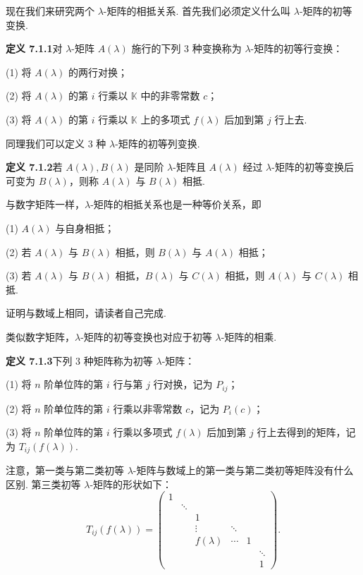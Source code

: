 \documentclass[UTF8,12pt,a4paper,fontset=fandol]{ctexart}
\begin{document}
现在我们来研究两个 $\lambda$-矩阵的相抵关系. 首先我们必须定义什么叫 $\lambda$-矩阵的初等变换.

\noindent\textbf{定义 7.1.1}\quad 对 $\lambda$-矩阵 $A(\lambda)$ 施行的下列 3 种变换称为 $\lambda$-矩阵的初等行变换：

(1) 将 $A(\lambda)$ 的两行对换；

(2) 将 $A(\lambda)$ 的第 $i$ 行乘以 $\mathbb{K}$ 中的非零常数 $c$；

(3) 将 $A(\lambda)$ 的第 $i$ 行乘以 $\mathbb{K}$ 上的多项式 $f(\lambda)$ 后加到第 $j$ 行上去.

同理我们可以定义 3 种 $\lambda$-矩阵的初等列变换.

\noindent\textbf{定义 7.1.2}\quad 若 $A(\lambda),B(\lambda)$ 是同阶 $\lambda$-矩阵且 $A(\lambda)$ 经过 $\lambda$-矩阵的初等变换后可变为 $B(\lambda)$，则称 $A(\lambda)$ 与 $B(\lambda)$ 相抵.

与数字矩阵一样，$\lambda$-矩阵的相抵关系也是一种等价关系，即

(1) $A(\lambda)$ 与自身相抵；

(2) 若 $A(\lambda)$ 与 $B(\lambda)$ 相抵，则 $B(\lambda)$ 与 $A(\lambda)$ 相抵；

(3) 若 $A(\lambda)$ 与 $B(\lambda)$ 相抵，$B(\lambda)$ 与 $C(\lambda)$ 相抵，则 $A(\lambda)$ 与 $C(\lambda)$ 相抵.

证明与数域上相同，请读者自己完成.

类似数字矩阵，$\lambda$-矩阵的初等变换也对应于初等 $\lambda$-矩阵的相乘.

\noindent\textbf{定义 7.1.3}\quad 下列 3 种矩阵称为初等 $\lambda$-矩阵：

(1) 将 $n$ 阶单位阵的第 $i$ 行与第 $j$ 行对换，记为 $P_{ij}$；

(2) 将 $n$ 阶单位阵的第 $i$ 行乘以非零常数 $c$，记为 $P_i(c)$；

(3) 将 $n$ 阶单位阵的第 $i$ 行乘以多项式 $f(\lambda)$ 后加到第 $j$ 行上去得到的矩阵，记为 $T_{ij}(f(\lambda))$.

注意，第一类与第二类初等 $\lambda$-矩阵与数域上的第一类与第二类初等矩阵没有什么区别. 第三类初等 $\lambda$-矩阵的形状如下：
\[
T_{ij}(f(\lambda))=
\left(\begin{array}{cccccc}
1 & & & & & \\
& \ddots & & & & \\
& & 1 & & & \\
& & \vdots & \ddots & & \\
& & f(\lambda) & \cdots & 1 & \\
& & & & & \ddots\\
& & & & & 1
\end{array}\right).
\]
\end{document}
